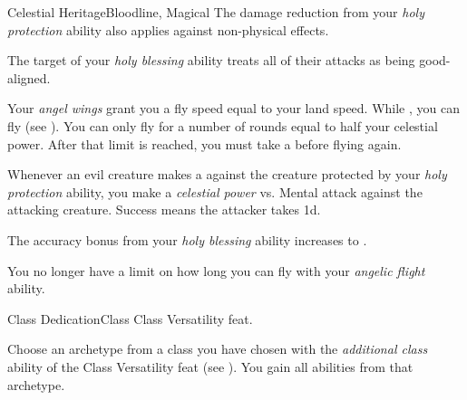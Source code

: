 \begin{feat}{Celestial Heritage}{Bloodline, Magical}
         The damage reduction from your \textit{holy protection} ability also applies against non-physical effects.

         The target of your \textit{holy blessing} ability treats all of their attacks as being good-aligned.

         Your \textit{angel wings} grant you a fly speed equal to your land speed.
        While , you can fly (see ).
        You can only fly for a number of rounds equal to half your celestial power.
        After that limit is reached, you must take a  before flying again.

         Whenever an evil creature makes a  against the creature protected by your \textit{holy protection} ability, you make a \textit{celestial power} vs. Mental attack against the attacking creature.
        Success means the attacker takes  \minus1d.

         The accuracy bonus from your \textit{holy blessing} ability increases to .

        \ff[17]{} %

         You no longer have a limit on how long you can fly with your \textit{angelic flight} ability.
    \end{feat}

    \begin{feat}{Class Dedication}{Class}
        \featpre Class Versatility feat.
        \featben

         Choose an archetype from a class you have chosen with the \textit{additional class} ability of the Class Versatility feat (see ).
        You gain all abilities from that archetype.

    \end{feat}

